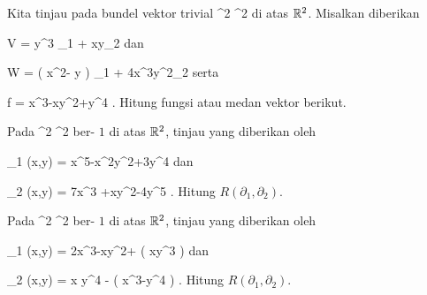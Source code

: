 \setcounter{section}{28}


{}
{

Kita tinjau
pada bundel vektor trivial
\maabbdisp {} {\R^2 \times \R } { \R^2
} {}
di atas ${\mathbb R}^2$. Misalkan diberikan

\mavergleichskettedisp
{\vergleichskette
{ V
}
{ =} { y^3 \partial_1 + xy\partial_2
}
{ } {
}
{ } {
}
{ } {
}
}
{}{}{}
dan

\mavergleichskettedisp
{\vergleichskette
{ W
}
{ =} { \left(  x^2- y  \right)  \partial_1 + 4x^3y^2\partial_2
}
{ } {
}
{ } {
}
{ } {
}
}
{}{}{}
serta

\mavergleichskettedisp
{\vergleichskette
{ f
}
{ =} { x^3-xy^2+y^4
}
{ } {
}
{ } {
}
{ } {
}
}
{}{}{.}
Hitung fungsi atau medan vektor berikut.

}
{} {}

{}
{

Pada
 {\R^2 \times \R} { \R^2
} {}
ber-
$1$ di atas ${\mathbb R}^2$, tinjau
yang diberikan oleh

\mavergleichskette
{\vergleichskette
{ \Gamma_1 (x,y)
}
{ = }{ x^5-x^2y^2+3y^4
}
{  }{
}
{    }{
}
{   }{
}
}
{}{}{}
dan

\mavergleichskette
{\vergleichskette
{ \Gamma_2 (x,y)
}
{ = }{ 7x^3 +xy^2-4y^5
}
{  }{
}
{    }{
}
{   }{
}
}
{}{}{.}
Hitung
$R \left(  \partial_1, \partial_2  \right)$.

}
{} {}

{}
{

Pada
 {\R^2 \times \R} { \R^2
} {}
ber-
$1$ di atas ${\mathbb R}^2$, tinjau
yang diberikan oleh

\mavergleichskette
{\vergleichskette
{ \Gamma_1 (x,y)
}
{ = }{ 2x^3-xy^2+  \sinh  \left(  xy^3  \right)
}
{  }{
}
{    }{
}
{   }{
}
}
{}{}{}
dan

\mavergleichskette
{\vergleichskette
{ \Gamma_2 (x,y)
}
{ = }{ x y^4 -   \exp  \left(  x^3-y^4 \right)
}
{  }{
}
{    }{
}
{   }{
}
}
{}{}{.}
Hitung
$R \left(  \partial_1, \partial_2  \right)$.

}
{} {}

